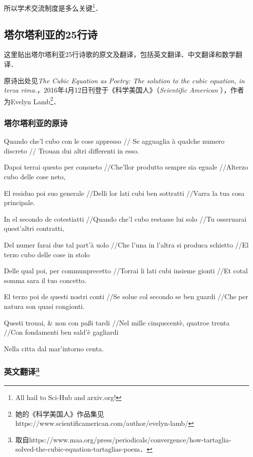 所以学术交流制度是多么关键\footnote{All hail to Sci-Hub and arxiv.org! }．


\subsection{塔尔塔利亚的25行诗}\label{PlyRtS_sub2}

这里贴出塔尔塔利亚25行诗歌的原文及翻译，包括英文翻译、中文翻译和数学翻译．

原诗出处见\textsl{The Cubic Equation as Poetry:
The solution to the cubic equation, in terza rima.}，2016年4月12日刊登于《科学美国人》（\textsl{Scientific American} ），作者为Evelyn Lamb\footnote{她的《科学美国人》作品集见https://www.scientificamerican.com/author/evelyn-lamb/}．



\subsubsection{塔尔塔利亚的原诗}

Quando che'l cubo con le cose appresso 
//
Se agguaglia à qualche numero discreto
//
Trouan dui altri differenti in esso.



Dapoi terrai questo per consueto
​//Che'llor produtto sempre sia eguale
//​Alterzo cubo delle cose neto,
 

El residuo poi suo generale 
//Delli lor lati cubi ben sottratti
//​Varra la tua cosa principale.
 

In el secondo de cotestiatti 
​//Quando che'l cubo restasse lui solo 
//Tu osseruarai quest'altri contratti,
 

Del numer farai due tal part'à uolo 
//Che l'una in l'altra si produca schietto
//El terzo cubo delle cose in stolo
​

Delle qual poi, per communprecetto 
​//Torrai li lati cubi insieme gionti 
//Et cotal somma sara il tuo concetto.
 

El terzo poi de questi nostri conti 
//Se solue col secondo se ben guardi 
//Che per natura son quasi congionti.
 

Questi trouai, & non con paßi tardi 
//Nel mille cinquecentè, quatroe trenta 
//Con fondamenti ben sald'è gagliardi
​

Nella citta dal mar'intorno centa.


\subsubsection{英文翻译\footnote{取自https://www.maa.org/press/periodicals/convergence/how-tartaglia-solved-the-cubic-equation-tartaglias-poem．}}

